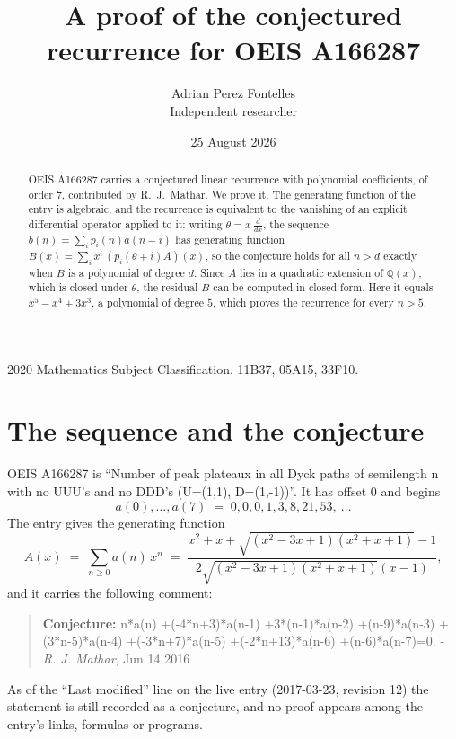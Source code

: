 \documentclass[11pt,a4paper]{article}
\title{A proof of the conjectured recurrence for OEIS A166287}
\author{Adrian Perez Fontelles\\ \small Independent researcher}
\date{25 August 2026}
\theoremstyle{plain}
\theoremstyle{definition}
\begin{document}
\maketitle

\begin{abstract}
OEIS A166287 carries a conjectured linear recurrence with polynomial coefficients, of
order 7, contributed by R.~J.~Mathar. We prove it. The generating function of the
entry is algebraic, and the recurrence is equivalent to the vanishing of an explicit
differential operator applied to it: writing $\theta=x\,\frac{d}{dx}$, the sequence
$b(n)=\sum_{i}p_{i}(n)a(n-i)$ has generating function
$B(x)=\sum_{i}x^{i}\,(p_{i}(\theta+i)A)(x)$, so the conjecture holds for all $n>d$ exactly
when $B$ is a polynomial of degree $d$. Since $A$ lies in a quadratic extension of
$\mathbb{Q}(x)$, which is closed under $\theta$, the residual $B$ can be computed in
closed form. Here it equals $x^{5} - x^{4} + 3 x^{3}$, a polynomial of degree $5$, which proves
the recurrence for every $n>5$.
\end{abstract}

\noindent\small 2020 Mathematics Subject Classification. 11B37, 05A15, 33F10.\normalsize

\section{The sequence and the conjecture}

OEIS A166287 is ``Number of peak plateaux in all Dyck paths of semilength n with no UUU's and no DDD's (U=(1,1), D=(1,-1))''. It has offset $0$ and begins
\[
a(0),\dots,a(7)\;=\;0, 0, 0, 1, 3, 8, 21, 53,\ \dots
\]
The entry gives the generating function
\begin{equation}\label{eq:gf}
A(x)\;=\;\sum_{n\ge 0} a(n)\,x^{n}\;=\;\frac{x^{2} + x + \sqrt{\left(x^{2} - 3 x + 1\right) \left(x^{2} + x + 1\right)} - 1}{2 \sqrt{\left(x^{2} - 3 x + 1\right) \left(x^{2} + x + 1\right)} \left(x - 1\right)} ,
\end{equation}
and it carries the following comment:
\begin{quote}\small
\textbf{Conjecture:} n*a(n) +(-4*n+3)*a(n-1) +3*(n-1)*a(n-2) +(n-9)*a(n-3) +(3*n-5)*a(n-4) +(-3*n+7)*a(n-5) +(-2*n+13)*a(n-6) +(n-6)*a(n-7)=0. - \emph{R. J. Mathar}, Jun 14 2016
\end{quote}
As of the ``Last modified'' line on the live entry (2017-03-23, revision 12) the
statement is still recorded as a conjecture, and no proof appears among the entry's links,
formulas or programs.
\end{document}
